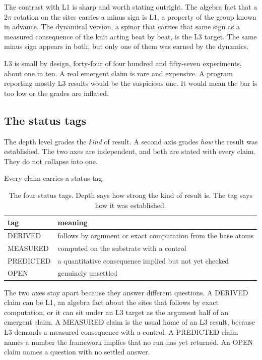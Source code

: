 The contrast with L1 is sharp and worth stating outright. The algebra fact that a $2\pi$ rotation on the sites carries a minus sign is L1, a property of the group known in advance. The dynamical version, a spinor that carries that same sign as a measured consequence of the knit acting beat by beat, is the L3 target. The same minus sign appears in both, but only one of them was earned by the dynamics.

\begin{principle}
L3 is small by design, forty-four of four hundred and fifty-seven experiments, about one in ten. A real emergent claim is rare and expensive. A program reporting mostly L3 results would be the suspicious one. It would mean the bar is too low or the grades are inflated.
\end{principle}

\subsection{The status tags}

The depth level grades the \emph{kind} of result. A second axis grades \emph{how} the result was established. The two axes are independent, and both are stated with every claim. They do not collapse into one.

Every claim carries a status tag.

\begin{table}[ht]
\centering
\begin{tabular}{@{}ll@{}}
\toprule
tag & meaning \\
\midrule
DERIVED & follows by argument or exact computation from the base atoms \\
MEASURED & computed on the substrate with a control \\
PREDICTED & a quantitative consequence implied but not yet checked \\
OPEN & genuinely unsettled \\
\bottomrule
\end{tabular}
\caption{The four status tags. Depth says how strong the kind of result is. The tag says how it was established.}
\label{tab:status-tags}
\end{table}

The two axes stay apart because they answer different questions. A DERIVED claim can be L1, an algebra fact about the sites that follows by exact computation, or it can sit under an L3 target as the argument half of an emergent claim. A MEASURED claim is the usual home of an L3 result, because L3 demands a measured consequence with a control. A PREDICTED claim names a number the framework implies that no run has yet returned. An OPEN claim names a question with no settled answer.

